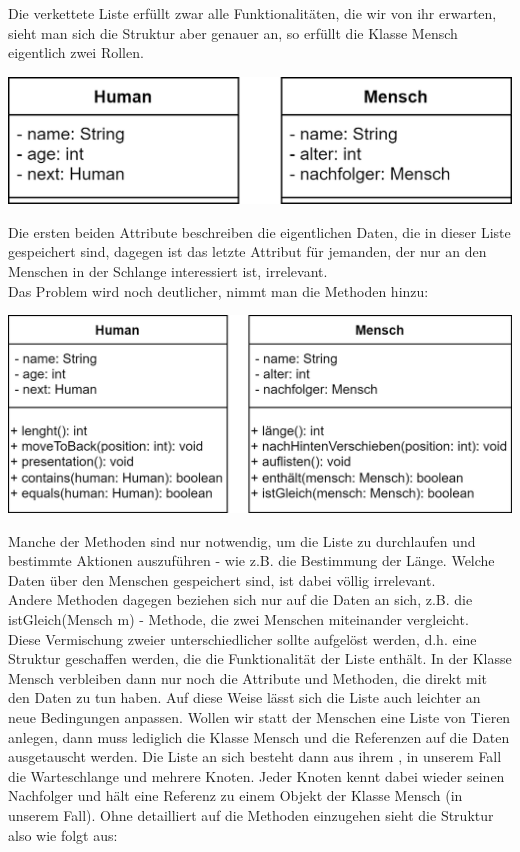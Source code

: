 \documentclass{article}
\begin{document}
Die verkettete Liste erfüllt zwar alle Funktionalitäten, die wir von ihr erwarten, sieht man sich die Struktur aber genauer an, so erfüllt die Klasse Mensch eigentlich zwei Rollen. \\
\begin{center}
    \includegraphics[scale = 0.2]{../media/human_v2.png}
\end{center}
Die ersten beiden Attribute beschreiben die eigentlichen Daten, die in dieser Liste gespeichert sind, dagegen ist das letzte Attribut für jemanden, der nur an den Menschen in der Schlange interessiert ist, irrelevant. \\
Das Problem wird noch deutlicher, nimmt man die Methoden hinzu: 
\begin{center}
    \includegraphics[scale = 0.2]{../media/human_v3.png}
\end{center}
Manche der Methoden sind nur notwendig, um die Liste zu durchlaufen und bestimmte Aktionen auszuführen - wie z.B. die Bestimmung der Länge. Welche Daten über den Menschen gespeichert sind, ist dabei völlig irrelevant. \\
Andere Methoden dagegen beziehen sich nur auf die Daten an sich, z.B. die istGleich(Mensch m) - Methode, die zwei Menschen miteinander vergleicht. \\
Diese Vermischung zweier unterschiedlicher sollte aufgelöst werden, d.h. eine Struktur geschaffen werden, die die Funktionalität der Liste enthält. In der Klasse Mensch verbleiben dann nur noch die Attribute und Methoden, die direkt mit den Daten zu tun haben. Auf diese Weise lässt sich die Liste auch leichter an neue Bedingungen anpassen. Wollen wir statt der Menschen eine Liste von Tieren anlegen, dann muss lediglich die Klasse Mensch und die Referenzen auf die Daten ausgetauscht werden. Die Liste an sich besteht dann aus ihrem , in unserem Fall die Warteschlange und mehrere Knoten. Jeder Knoten kennt dabei wieder seinen Nachfolger und hält eine Referenz zu einem Objekt der Klasse Mensch (in unserem Fall). Ohne detailliert auf die Methoden einzugehen sieht die Struktur also wie folgt aus: 
\end{document}
